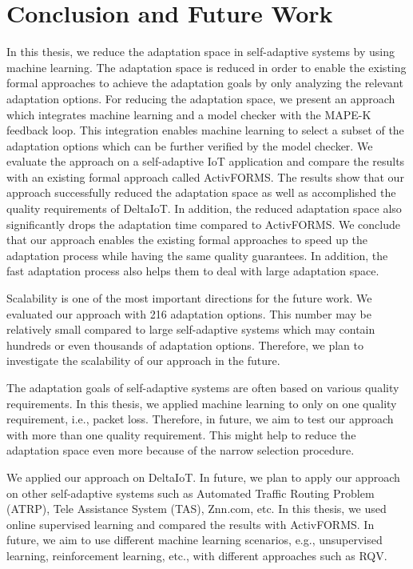 \documentclass[a4paper,12pt]{article}
\begin{document}
\section{Conclusion and Future Work} \label{Conclusion}
In this thesis, we reduce the adaptation space in self-adaptive systems by using machine learning. The adaptation space is reduced in order to enable the existing formal approaches to achieve the adaptation goals by only analyzing the relevant adaptation options. For reducing the adaptation space, we present an approach which integrates machine learning and a model checker with the MAPE-K feedback loop. This integration enables machine learning to select a subset of the adaptation options which can be further verified by the model checker. We evaluate the approach on a self-adaptive IoT application and compare the results with an existing formal approach called ActivFORMS. The results show that our approach successfully reduced the adaptation space as well as accomplished the quality requirements of DeltaIoT. In addition, the reduced adaptation space also significantly drops the adaptation time compared to ActivFORMS. We conclude that our approach enables the existing formal approaches to speed up the adaptation process while having the same quality guarantees. In addition, the fast adaptation process also helps them to deal with large adaptation space.

Scalability is one of the most important directions for the future work. We evaluated our approach with 216 adaptation options. This number may be relatively small compared to large self-adaptive systems which may contain hundreds or even thousands of adaptation options. Therefore, we plan to investigate the scalability of our approach in the future.

The adaptation goals of self-adaptive systems are often based on various quality requirements. In this thesis, we applied machine learning to only on one quality requirement, i.e., packet loss. Therefore, in future, we aim to test our approach with more than one quality requirement. This might help to reduce the adaptation space even more because of the narrow selection procedure.

We applied our approach on DeltaIoT. In future, we plan to apply our approach on other self-adaptive systems such as Automated Traffic Routing Problem (ATRP), Tele Assistance System (TAS), Znn.com, etc. In this thesis, we used online supervised learning and compared the results with ActivFORMS. In future, we aim to use different machine learning scenarios, e.g., unsupervised learning, reinforcement learning, etc., with different approaches such as RQV. 
\newpage
\hypersetup{urlcolor=black} 


\newpage
{}
\setcounter{page}{1}
\appendix
\end{document}
